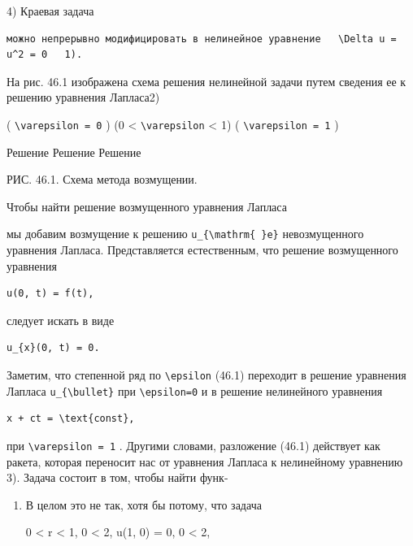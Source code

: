 \documentclass[
  ukrainian,
]{article}
\begin{document}
4) Краевая задача

\begin{verbatim}
можно непрерывно модифицировать в нелинейное уравнение   \Delta u = u^2 = 0   1).
\end{verbatim}

На рис. 46.1 изображена схема решения нелинейной задачи путем сведения
ее к решению уравнения Лапласа2)

( \texttt{\textbackslash{}varepsilon\ =\ 0} ) (0 \textless{}
\texttt{\textbackslash{}varepsilon} \textless{} 1) (
\texttt{\textbackslash{}varepsilon\ =\ 1} )

Решение Решение Решение

РИС. 46.1. Схема метода возмущении.

Чтобы найти решение возмущенного уравнения Лапласа

мы добавим возмущение к решению
\texttt{u\_\{\textbackslash{}mathrm\{\ \}e\}} невозмущенного уравнения
Лапласа. Представляется естественным, что решение возмущенного уравнения

\begin{verbatim}
u(0, t) = f(t),
\end{verbatim}

следует искать в виде

\begin{verbatim}
u_{x}(0, t) = 0.
\end{verbatim}

Заметим, что степенной ряд по \texttt{\textbackslash{}epsilon} (46.1)
переходит в решение уравнения Лапласа
\texttt{u\_\{\textbackslash{}bullet\}} при
\texttt{\textbackslash{}epsilon=0} и в решение нелинейного уравнения

\begin{verbatim}
x + ct = \text{const},
\end{verbatim}

при \texttt{\textbackslash{}varepsilon\ =\ 1} . Другими словами,
разложение (46.1) действует как ракета, которая переносит нас от
уравнения Лапласа к нелинейному уравнению 3). Задача состоит в том,
чтобы найти функ-

\begin{enumerate}
\def\labelenumi{\arabic{enumi})}
\item
  В целом это не так, хотя бы потому, что задача

  0 \textless{} r \textless{} 1, 0 \le \theta \textless{} 2\pi, u(1, 0)
  = 0, 0 \le \theta \textless{} 2\pi,
\end{enumerate}
\end{document}
